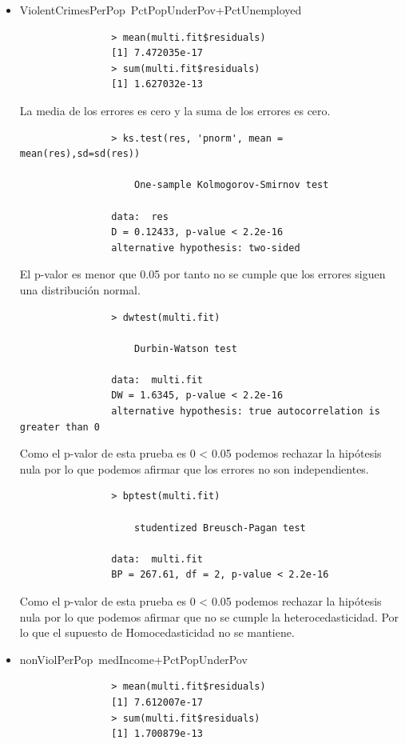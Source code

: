 \documentclass[a4paper,10pt,twocolumn]{article}
\begin{document}
	\begin{itemize}
		\item {ViolentCrimesPerPop~PctPopUnderPov+PctUnemployed}
		
			\begin{verbatim}
				> mean(multi.fit$residuals)
				[1] 7.472035e-17
				> sum(multi.fit$residuals)
				[1] 1.627032e-13
			\end{verbatim}

			La media de los errores es cero y la suma de los errores es cero.

			\begin{verbatim}
				> ks.test(res, 'pnorm', mean = mean(res),sd=sd(res))

					One-sample Kolmogorov-Smirnov test

				data:  res
				D = 0.12433, p-value < 2.2e-16
				alternative hypothesis: two-sided

			\end{verbatim}
			
			El p-valor es menor que 0.05 por tanto no se cumple que los errores siguen una distribución normal.

			\begin{verbatim}
				> dwtest(multi.fit)

					Durbin-Watson test

				data:  multi.fit
				DW = 1.6345, p-value < 2.2e-16
				alternative hypothesis: true autocorrelation is greater than 0
			\end{verbatim}

			Como el p-valor de esta prueba es 0 < 0.05 podemos rechazar la hipótesis nula por lo que 
			podemos afirmar que los errores no son independientes. 

			\begin{verbatim}
				> bptest(multi.fit)

					studentized Breusch-Pagan test

				data:  multi.fit
				BP = 267.61, df = 2, p-value < 2.2e-16
			\end{verbatim}

			Como el p-valor de esta prueba es 0 < 0.05 podemos rechazar la hipótesis nula por lo que podemos 
			afirmar que no se cumple la heterocedasticidad. Por lo que el supuesto de Homocedasticidad no se mantiene.

		\item {nonViolPerPop~medIncome+PctPopUnderPov}
			\begin{verbatim}
				> mean(multi.fit$residuals)
				[1] 7.612007e-17
				> sum(multi.fit$residuals)
				[1] 1.700879e-13
			\end{verbatim}
			

\end{itemize}
\end{document}
